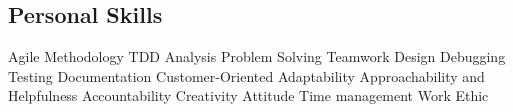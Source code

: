 \documentclass[]{aj-resume-openfont}
\begin{document}
\begin{minipage}[t]{0.33\textwidth}
\subsection{Personal Skills}
\textbullet{}Agile Methodology \textbullet{}TDD \textbullet{}Analysis
\textbullet{}Problem Solving \textbullet{}Teamwork \textbullet{}Design
\textbullet{}Debugging \textbullet{}Testing \textbullet{}Documentation 
\textbullet{}Customer-Oriented \textbullet{}Adaptability
\textbullet{}Approachability and Helpfulness \textbullet{}Accountability 
\textbullet{}Creativity \textbullet{}Attitude \textbullet{}Time management
\textbullet{}Work Ethic\\
\sectionsep

%
%

\end{minipage} 
\hfill
\end{document}
